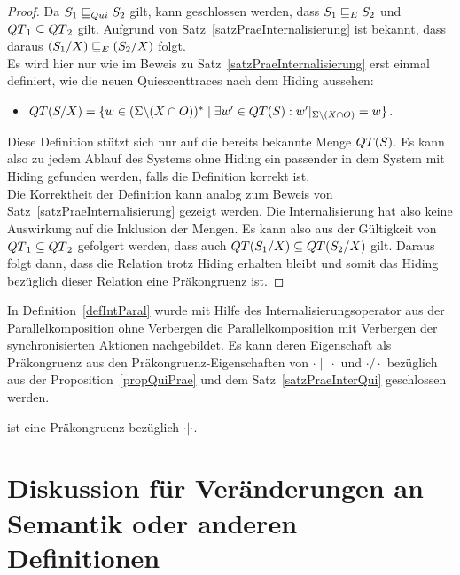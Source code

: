 \begin{proof}
  Da $S_1\sqsubseteq _{Qui} S_2$ gilt, kann geschlossen werden, dass $S_1\sqsubseteq _E S_2$ und
  $QT{}_1\subseteq QT{}_2$ gilt. Aufgrund von
  Satz~\ref{satzPraeInternalisierung} ist bekannt, dass daraus $(S_1/X)\sqsubseteq _E
  (S_2/X)$ folgt.\\
  Es wird hier nur wie im Beweis zu Satz~\ref{satzPraeInternalisierung} erst
  einmal definiert, wie die neuen Quiescenttraces nach dem Hiding aussehen:
  \begin{itemize}
    \item $QT{}(S/X) = \{w\in (\Sigma\backslash (X\cap O))^*\mid \exists w'\in
      QT{}(S):w'|_{\Sigma\backslash (X\cap O)}=w\}$.
  \end{itemize}
  Diese Definition stützt sich nur auf die bereits bekannte Menge $QT{}(S)$.
  Es kann also zu jedem Ablauf des Systems ohne Hiding ein passender in dem
  System mit Hiding gefunden werden, falls die Definition korrekt ist.\\
  Die Korrektheit der Definition kann analog zum Beweis von
  Satz~\ref{satzPraeInternalisierung} gezeigt werden. Die Internalisierung hat
  also keine Auswirkung auf die Inklusion der Mengen. Es kann also aus der
  Gültigkeit von $QT{}_1\subseteq QT{}_2$ gefolgert werden, dass auch
  $QT{}(S_1/X)\subseteq QT{}(S_2/X)$ gilt. Daraus folgt dann, dass die Relation
  \QRel{} trotz Hiding erhalten bleibt und somit das Hiding bezüglich dieser
  Relation eine Präkongruenz ist.
\end{proof}

In Definition~\ref{defIntParal} wurde mit Hilfe des Internalisierungsoperator
aus der Parallelkomposition ohne Verbergen die Parallelkomposition mit
Verbergen der synchronisierten Aktionen nachgebildet. Es kann deren
Eigenschaft als Präkongruenz aus den Präkongruenz-Eigenschaften von
$\cdot\|\cdot$ und $\cdot /\cdot$ bezüglich \QRel{} aus der
Proposition~\ref{propQuiPrae} und dem Satz~\ref{satzPraeInterQui} geschlossen
werden.

\begin{kor}
  \QRel{} ist eine Präkongruenz bezüglich $\cdot |\cdot$.
\end{kor}

\section{Diskussion für Veränderungen an Semantik oder anderen Definitionen}

